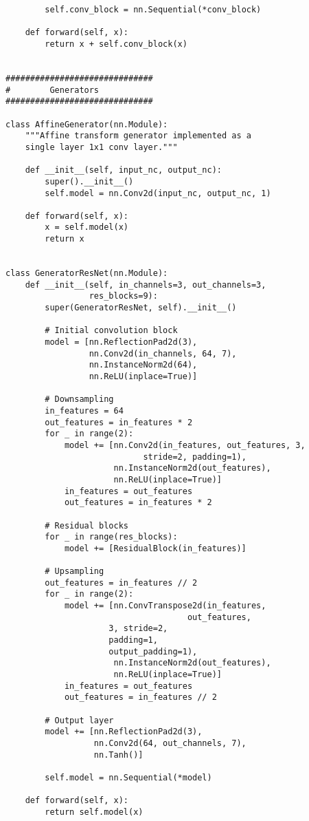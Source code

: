 \documentclass[../main.tex]{subfiles}
\begin{document}
\begin{lstlisting}
        self.conv_block = nn.Sequential(*conv_block)

    def forward(self, x):
        return x + self.conv_block(x)


##############################
#        Generators
##############################

class AffineGenerator(nn.Module):
    """Affine transform generator implemented as a
    single layer 1x1 conv layer."""

    def __init__(self, input_nc, output_nc):
        super().__init__()
        self.model = nn.Conv2d(input_nc, output_nc, 1)

    def forward(self, x):
        x = self.model(x)
        return x


class GeneratorResNet(nn.Module):
    def __init__(self, in_channels=3, out_channels=3,
                 res_blocks=9):
        super(GeneratorResNet, self).__init__()

        # Initial convolution block
        model = [nn.ReflectionPad2d(3),
                 nn.Conv2d(in_channels, 64, 7),
                 nn.InstanceNorm2d(64),
                 nn.ReLU(inplace=True)]

        # Downsampling
        in_features = 64
        out_features = in_features * 2
        for _ in range(2):
            model += [nn.Conv2d(in_features, out_features, 3,
	                        stride=2, padding=1),
                      nn.InstanceNorm2d(out_features),
                      nn.ReLU(inplace=True)]
            in_features = out_features
            out_features = in_features * 2

        # Residual blocks
        for _ in range(res_blocks):
            model += [ResidualBlock(in_features)]

        # Upsampling
        out_features = in_features // 2
        for _ in range(2):
            model += [nn.ConvTranspose2d(in_features,
	                                 out_features,
					 3, stride=2,
					 padding=1,
					 output_padding=1),
                      nn.InstanceNorm2d(out_features),
                      nn.ReLU(inplace=True)]
            in_features = out_features
            out_features = in_features // 2

        # Output layer
        model += [nn.ReflectionPad2d(3),
                  nn.Conv2d(64, out_channels, 7),
                  nn.Tanh()]

        self.model = nn.Sequential(*model)

    def forward(self, x):
        return self.model(x)



\end{lstlisting}
\end{document}
